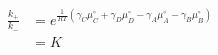\begin{eqnarray}\label{eqn:equilibrium-constant}
\frac{k_+}{k_-} & =   e^{\frac{1}{RT}\left(\gamma_C\mu_C^\circ+ \gamma_D\mu_D^\circ -\gamma_A\mu_A^\circ-\gamma_B\mu_B^\circ\right)} \\
&= K
\end{eqnarray}